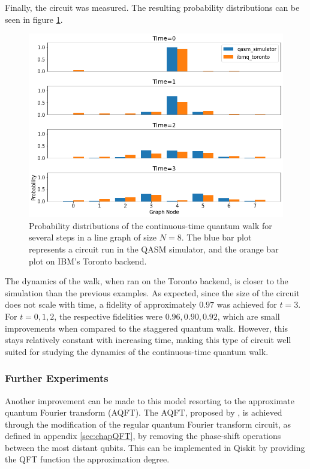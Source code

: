\documentclass[../../dissertation.tex]{subfiles}
\begin{document}
Finally, the circuit was measured. The resulting probability distributions
can be seen in figure \ref{fig:contQWQiskitDist}.
\begin{figure}[!h]
	\centering
	\includegraphics[scale=0.4]{img/Qiskit/ContQuantumWalk/ContQW_N3_S0123.png}
	\caption{Probability distributions of the continuous-time quantum walk for several steps in a line graph of size $N=8$. The blue bar plot represents a circuit run in the QASM simulator, and the orange bar plot on IBM's Toronto backend.} 
	\label{fig:contQWQiskitDist}
\end{figure}
The dynamics of the walk, when ran on the Toronto backend, is closer to the
simulation than the previous examples. As expected, since the size of the
circuit does not scale with time, a fidelity of approximately $0.97$ was
achieved for $t=3$. For $t=0,1,2$, the respective fidelities were $0.96, 0.90,
0.92$, which are small improvements when compared to the staggered quantum
walk. However, this stays relatively constant with increasing time, making this type
of circuit well suited for studying the dynamics of the continuous-time quantum
walk.

\subsubsection{Further Experiments}
Another improvement can be made to this model resorting to the approximate quantum
Fourier transform (AQFT). The AQFT, proposed by \cite{Coppersmith94}, is
achieved through the modification of the regular quantum Fourier transform
circuit, as defined in appendix \ref{sec:chapQFT}, by removing the phase-shift
operations between the most distant qubits. This can be implemented in Qiskit
by providing the QFT function the approximation degree.\par
\end{document}
